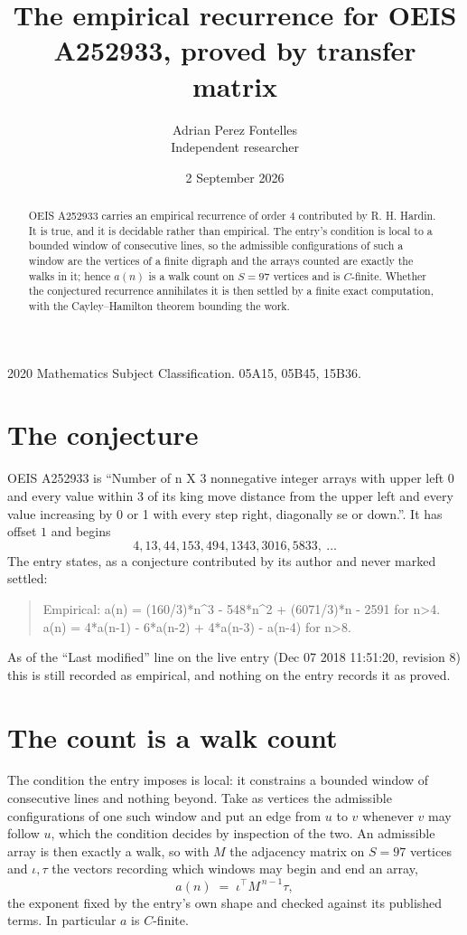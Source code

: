 \documentclass[11pt,a4paper]{article}
\title{The empirical recurrence for OEIS A252933, proved by transfer matrix}
\author{Adrian Perez Fontelles\\ \small Independent researcher}
\date{2 September 2026}
\theoremstyle{plain}
\theoremstyle{definition}
\begin{document}
\maketitle

\begin{abstract}
OEIS A252933 carries an empirical recurrence of order $4$ contributed by R. H. Hardin. It is
true, and it is decidable rather than empirical. The entry's condition is local to a bounded window of consecutive lines, so
the admissible configurations of such a window are the vertices of a finite digraph and the
arrays counted are exactly the walks in it; hence $a(n)$ is a walk count on $S=97$ vertices
and is $C$-finite. Whether the conjectured recurrence annihilates it is then settled by a
finite exact computation, with the Cayley--Hamilton theorem bounding the work.
\end{abstract}

\noindent\small 2020 Mathematics Subject Classification. 05A15, 05B45, 15B36.\normalsize

\section{The conjecture}

OEIS A252933 is ``Number of n X 3 nonnegative integer arrays with upper left 0 and every value within 3 of its king move distance from the upper left and every value increasing by 0 or 1 with every step right, diagonally se or down.''. It has offset $1$ and begins
\[
4, 13, 44, 153, 494, 1343, 3016, 5833,\ \dots
\]
The entry states, as a conjecture contributed by its author and never marked settled:
\begin{quote}
Empirical: a(n) = (160/3)*n\^{}3 - 548*n\^{}2 + (6071/3)*n - 2591 for n>4. a(n) = 4*a(n-1) - 6*a(n-2) + 4*a(n-3) - a(n-4) for n>8.
\end{quote}
As of the ``Last modified'' line on the live entry (Dec 07 2018 11:51:20, revision 8) this is still
recorded as empirical, and nothing on the entry records it as proved.

\section{The count is a walk count}

The condition the entry imposes is local: it constrains a bounded window of consecutive lines and nothing beyond. Take as
vertices the admissible configurations of one such window and put an edge from $u$ to $v$
whenever $v$ may follow $u$, which the condition decides by inspection of the two. An
admissible array is then exactly a walk, so with $M$ the adjacency matrix on $S=97$ vertices
and $\iota,\tau$ the vectors recording which windows may begin and end an array,
\[
a(n)\;=\;\iota^{\!\top}M^{\,n-1}\tau ,
\]
the exponent fixed by the entry's own shape and checked against its published terms. In
particular $a$ is $C$-finite.
\end{document}
